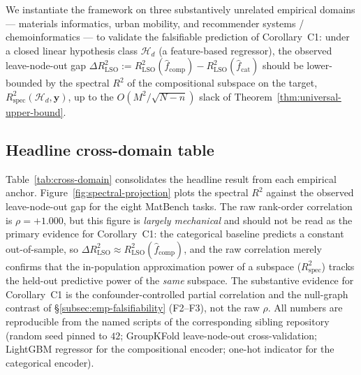 \documentclass[11pt,a4paper]{article}
\theoremstyle{plain}
\theoremstyle{definition}
\theoremstyle{remark}
\newcommand{\by}{\mathbf{y}}
\newcommand{\Rspec}{R^2_{\mathrm{spec}}}
\newcommand{\Hcal}{\mathcal{H}}
\begin{document}
We instantiate the framework on three substantively unrelated empirical
domains --- materials informatics, urban mobility, and recommender
systems / chemoinformatics --- to validate the falsifiable prediction
of Corollary~C1: under a closed linear hypothesis class $\Hcal_d$ (a
feature-based regressor), the observed leave-node-out gap
$\Delta R^2_{\mathrm{LSO}} := R^2_{\mathrm{LSO}}(\hat f_{\mathrm{comp}})
- R^2_{\mathrm{LSO}}(\hat f_{\mathrm{cat}})$ should be lower-bounded
by the spectral $R^2$ of the compositional subspace on the target,
$\Rspec(\Hcal_d, \by)$, up to the $O(M^2/\sqrt{N-n})$ slack of
Theorem~\ref{thm:universal-upper-bound}.

\subsection{Headline cross-domain table}
\label{subsec:emp-headline-table}

Table~\ref{tab:cross-domain} consolidates the headline result from each
empirical anchor.  Figure~\ref{fig:spectral-projection} plots the
spectral $R^2$ against the observed leave-node-out gap for the eight
MatBench tasks.  The raw rank-order correlation is $\rho = +1.000$, but
this figure is \emph{largely mechanical} and should not be read as the
primary evidence for Corollary~C1: the categorical baseline predicts a
constant out-of-sample, so $\Delta R^2_{\mathrm{LSO}} \approx
R^2_{\mathrm{LSO}}(\hat f_{\mathrm{comp}})$, and the raw correlation
merely confirms that the in-population approximation power of a subspace
($\Rspec$) tracks the held-out predictive power of the \emph{same}
subspace.  The substantive evidence for Corollary~C1 is the
confounder-controlled partial correlation and the null-graph contrast of
\S\ref{subsec:emp-falsifiability} (F2--F3), not the raw $\rho$.  All
numbers are reproducible from the named
scripts of the corresponding sibling repository (random seed pinned to
$42$; GroupKFold leave-node-out cross-validation; LightGBM regressor
for the compositional encoder; one-hot indicator for the categorical
encoder).
\end{document}

